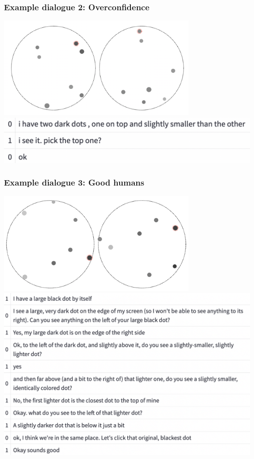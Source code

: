 \documentclass{beamer}
\begin{document}
\begin{frame}
\frametitle{Example dialogue 2: Overconfidence}
\centering
\includegraphics[width=0.75\textwidth]{img/dots2.png}
\includegraphics[width=\textwidth]{img/words2.png}
\end{frame}

\begin{frame}
\frametitle{Example dialogue 3: Good humans}
\centering
\includegraphics[width=0.75\textwidth]{img/dots3.png}
\includegraphics[width=\textwidth,clip,trim={0 9cm 0 0}]{img/words3.png}
\end{frame}
\end{document}
